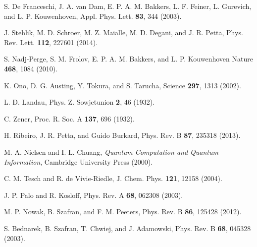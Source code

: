 \documentclass[prb,twocolumn,showpacs,floats]{revtex4}
\begin{document}
\begin{thebibliography}{99}
 S. De Franceschi, J. A. van Dam, E. P. A. M. Bakkers, L. F. Feiner,
L. Gurevich, and L. P. Kouwenhoven, 
Appl. Phys. Lett. {\bf 83}, 344 (2003).

J. Stehlik, M. D. Schroer, M. Z. Maialle, M. D.  Degani, and J. R. Petta,
 Phys. Rev. Lett. {\bf 112}, 227601 (2014).

 S. Nadj-Perge, S. M. Frolov, E. P. A. M. Bakkers, and L. P. Kouwenhoven
Nature {\bf 468}, 1084 (2010).

 K. Ono, D. G. Austing, Y. Tokura, and S. Tarucha, Science {\bf 297}, 1313 (2002).

 L. D. Landau, Phys. Z. Sowjetunion {\bf 2}, 46 (1932).

 C. Zener, Proc. R. Soc. A {\bf 137}, 696 (1932).

 H. Ribeiro, J. R. Petta, and Guido Burkard, Phys. Rev. B {\bf 87}, 235318 (2013).

 M. A. Nielsen and I. L. Chuang, {\it Quantum Computation and Quantum Information},
 Cambridge University Press (2000).

 C. M. Tesch and R. de Vivie-Riedle, J. Chem. Phys. {\bf 121}, 12158 (2004).

 J. P. Palo and R. Kosloff, Phys. Rev. A {\bf 68}, 062308 (2003).


 M. P. Nowak, B. Szafran, and F. M. Peeters, Phys. Rev. B {\bf 86}, 125428 (2012).

S. Bednarek, B. Szafran, T. Chwiej, and J. Adamowski, Phys. Rev. B {\bf 68}, 045328 (2003).


\end{thebibliography}
\end{document}
